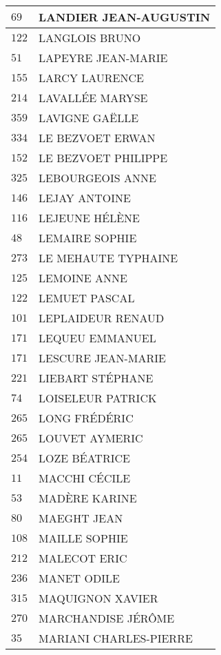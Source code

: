 \begin{xltabular}{\linewidth}{|l|X|}
    \hline
    $69$ & LANDIER JEAN-AUGUSTIN \\
    \hline
    $122$ & LANGLOIS BRUNO \\
    \hline
    $51$ & LAPEYRE JEAN-MARIE \\
    \hline
    $155$ & LARCY LAURENCE \\
    \hline
    $214$ & LAVALLÉE MARYSE \\
    \hline
    $359$ & LAVIGNE GAËLLE \\
    \hline
    $334$ & LE BEZVOET ERWAN \\
    \hline
    $152$ & LE BEZVOET PHILIPPE \\
    \hline
    $325$ & LEBOURGEOIS ANNE \\
    \hline
    $146$ & LEJAY ANTOINE \\
    \hline
    $116$ & LEJEUNE HÉLÈNE \\
    \hline
    $48$ & LEMAIRE SOPHIE \\
    \hline
    $273$ & LE MEHAUTE TYPHAINE \\
    \hline
    $125$ & LEMOINE ANNE \\
    \hline
    $122$ & LEMUET PASCAL \\
    \hline
    $101$ & LEPLAIDEUR RENAUD \\
    \hline
    $171$ & LEQUEU EMMANUEL \\
    \hline
    $171$ & LESCURE JEAN-MARIE \\
    \hline
    $221$ & LIEBART STÉPHANE \\
    \hline
    $74$ & LOISELEUR PATRICK \\
    \hline
    $265$ & LONG FRÉDÉRIC \\
    \hline
    $265$ & LOUVET AYMERIC \\
    \hline
    $254$ & LOZE BÉATRICE \\
    \hline
    $11$ & MACCHI CÉCILE \\
    \hline
    $53$ & MADÈRE KARINE \\
    \hline
    $80$ & MAEGHT JEAN \\
    \hline
    $108$ & MAILLE SOPHIE \\
    \hline
    $212$ & MALECOT ERIC \\
    \hline
    $236$ & MANET ODILE \\
    \hline
    $315$ & MAQUIGNON XAVIER \\
    \hline
    $270$ & MARCHANDISE JÉRÔME \\
    \hline
    $35$ & MARIANI CHARLES-PIERRE \\

\end{xltabular}
